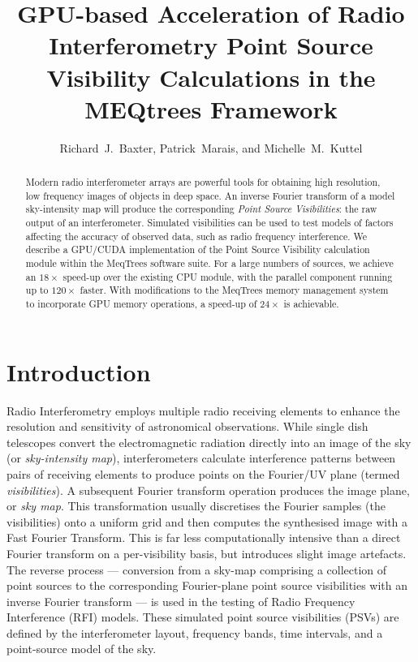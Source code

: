 \documentclass[11pt,twoside]{article}
\begin{document}

\newcommand\vecc[1]{\vec{#1}}

\title{GPU-based Acceleration of Radio Interferometry Point Source
Visibility Calculations in the MEQtrees Framework} 

\author{Richard~J.~Baxter, Patrick~Marais, and Michelle~M.~Kuttel
}

\begin{abstract}
  
Modern radio interferometer arrays are powerful tools for obtaining high
resolution, low frequency images of objects in deep space. An inverse Fourier
transform of a model sky-intensity map will produce the corresponding
\emph{Point Source Visibilities}:  the raw output of an interferometer.
Simulated visibilities can be used to test models of factors affecting the
accuracy of observed data, such as radio frequency interference. We describe a
GPU/CUDA implementation of the Point Source Visibility calculation module
within the MeqTrees software suite.  For a large numbers of sources, we
achieve an $18\times$ speed-up over the existing CPU module, with the parallel
component running up to $120\times$ faster. With modifications to the MeqTrees
memory management system to incorporate GPU memory operations, a speed-up of
$24\times$ is achievable.

\end{abstract}


\section{Introduction}

Radio Interferometry employs multiple radio receiving elements  to enhance the
resolution and sensitivity of astronomical observations. While single dish
telescopes convert the electromagnetic radiation directly into an image of the
sky (or \emph{sky-intensity map}), interferometers calculate interference
patterns between pairs of receiving elements to produce points on the
Fourier/UV plane (termed \emph{visibilities}).  A subsequent Fourier transform
operation produces the image plane, or \emph{sky map}. This transformation
usually discretises the Fourier samples (the visibilities) onto a uniform grid
and then computes the synthesised image with a Fast Fourier Transform.  This
is far less computationally intensive than a direct Fourier transform on a
per-visibility basis, but introduces slight image artefacts.  The reverse
process --- conversion from a sky-map comprising a collection of point sources
to the corresponding Fourier-plane point source visibilities  with an inverse
Fourier transform --- is used in the testing of Radio Frequency Interference
(RFI) models.  These simulated point source visibilities (PSVs) are defined by
the interferometer layout, frequency bands, time intervals, and a point-source
model of the sky.
\end{document}
